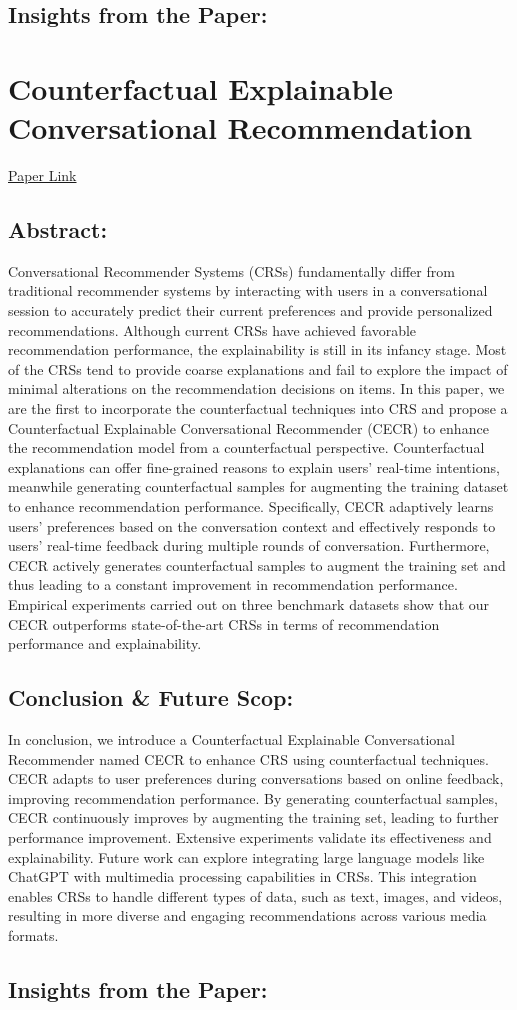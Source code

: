 \documentclass[]{report}
\begin{document}
	\section*{Insights from the Paper:}
	
	\chapter*{Counterfactual Explainable Conversational Recommendation}
	\begin{center}
		\href{https://ieeexplore.ieee.org/document/10273224}{Paper Link}
	\end{center}
	\section*{Abstract:}
	Conversational Recommender Systems (CRSs) fundamentally differ from traditional recommender systems by interacting with users in a conversational session to accurately predict their current preferences and provide personalized recommendations. Although current CRSs have achieved favorable recommendation performance, the explainability is still in its infancy stage. Most of the CRSs tend to provide coarse explanations and fail to explore the impact of minimal alterations on the recommendation decisions on items. In this paper, we are the first to incorporate the counterfactual techniques into CRS and propose a Counterfactual Explainable Conversational Recommender (CECR) to enhance the recommendation model from a counterfactual perspective. Counterfactual explanations can offer fine-grained reasons to explain users’ real-time intentions, meanwhile generating counterfactual samples for augmenting the training dataset to enhance recommendation performance. Specifically, CECR adaptively learns users’	preferences based on the conversation context and effectively responds to users’ real-time feedback during multiple rounds of conversation. Furthermore, CECR actively generates counterfactual samples to augment the training set and thus leading to a constant improvement in recommendation performance. Empirical experiments carried out on three benchmark datasets show that our CECR outperforms state-of-the-art CRSs in terms of recommendation performance and explainability.
	
	\section*{Conclusion \& Future Scop:}
	In conclusion, we introduce a Counterfactual Explainable Conversational Recommender named CECR to enhance CRS using counterfactual techniques. CECR adapts to user preferences during conversations based on online feedback, improving recommendation performance. By generating counterfactual samples, CECR continuously improves by augmenting the training set, leading to further performance improvement. Extensive experiments validate its effectiveness and explainability. Future work can explore integrating large language models like ChatGPT with multimedia processing capabilities in CRSs. This integration enables CRSs to handle different types of data, such as text, images, and videos, resulting in more diverse and engaging recommendations across various media formats.
	
	\section*{Insights from the Paper:}
	
	
\end{document}
